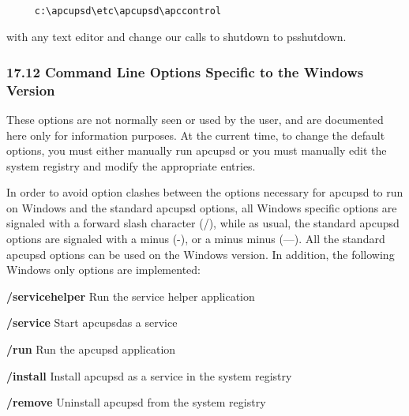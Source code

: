 {{{{{{{{{{\footnotesize
\begin{verbatim}
     
     c:\apcupsd\etc\apcupsd\apccontrol
\end{verbatim}
\normalsize

with any text editor and change our calls to shutdown to psshutdown. 

\label{Command-Line-Options-Specific-to-the-Windows-Version}

\subsubsection*{17.12 Command Line Options Specific to the Windows Version}

\label{index-Windows_002c-Options-186}
These options are not normally seen or used by the user, and are documented
here only for information purposes. At the current time, to change the default
options, you must either manually run apcupsd or you must manually edit the
system registry and modify the appropriate entries.  

In order to avoid option clashes between the options necessary for apcupsd to
run on Windows and the standard apcupsd options, all Windows specific options
are signaled with a forward slash character (/), while as usual, the standard
apcupsd options are signaled with a minus (-), or a minus minus ({---}). All
the standard apcupsd options can be used on the Windows version. In addition,
the following Windows only options are implemented:  

\begin{description}

\item {\bf /servicehelper}
Run the service helper application  

\item {\bf /service}
Start apcupsdas a service  

\item {\bf /run}
Run the apcupsd application  

\item {\bf /install}
Install apcupsd as a service in the system registry  

\item {\bf /remove}
Uninstall apcupsd from the system registry  


\end{description}}}}}}}}}}}
